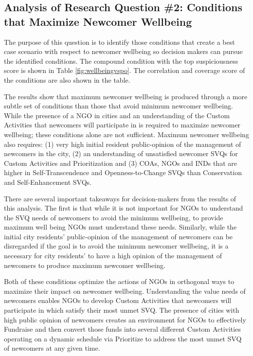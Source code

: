 \documentclass{scspaperproc}
\theoremstyle{scsthe}
\begin{document}
\subsection{Analysis of Research Question \#2: Conditions that Maximize Newcomer Wellbeing}
The purpose of this question is to identify those conditions that create a best case scenario with respect to newcomer wellbeing so decision makers can pursue the identified conditions. The compound condition with the top suspiciousness score is shown in Table \ref{fig:wellbeingvspo}. The correlation and coverage score of the conditions are also shown in the table. 

The results show that maximum newcomer wellbeing is produced through a more subtle set of conditions than those that avoid minimum newcomer wellbeing. While the presence of a NGO in cities and an understanding of the Custom Activities that newcomers will participate in is required to maximize newcomer wellbeing; these conditions alone are not sufficient. Maximum newcomer wellbeing also requires: (1) very high initial resident public-opinion of the management of newcomers in the city, (2) an understanding of unsatisfied newcomer SVQs for Custom Activities and Prioritization and (3) COAs, NGOs and INDs that are higher in Self-Transcendence and Openness-to-Change SVQs than Conservation and Self-Enhancement SVQs.

There are several important takeaways for decision-makers from the results of this analysis. The first is that while it is not important for NGOs to understand the SVQ needs of newcomers to avoid the minimum wellbeing, to provide maximum well being NGOs must understand these needs. Similarly, while the initial city residents' public-opinion of the management of newcomers can be disregarded if the goal is to avoid the minimum newcomer wellbeing, it is a necessary for city residents' to have a high opinion of the management of newcomers to produce maximum newcomer wellbeing. 

Both of these conditions optimize the actions of NGOs in orthogonal ways to maximize their impact on newcomer wellbeing. Understanding the value needs of newcomers enables NGOs to develop Custom Activities that newcomers will participate in which satisfy their most unmet SVQ. The presence of cities with high public opinion of newcomers creates an environment for NGOs to effectively Fundraise and then convert those funds into several different Custom Activities operating on a dynamic schedule via Prioritize to address the most unmet SVQ of newcomers at any given time. 
\end{document}
